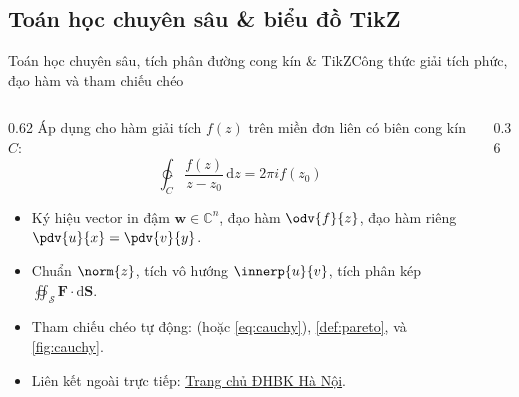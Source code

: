 \documentclass[aspectratio=169,10pt]{beamer}
\begin{document}
\subsection{Toán học chuyên sâu \& biểu đồ TikZ}
\begin{frame}{Toán học chuyên sâu, tích phân đường cong kín \& TikZ}{Công thức giải tích phức, đạo hàm và tham chiếu chéo}
  \begin{columns}[c]
    \begin{column}{0.62\textwidth}
      Áp dụng cho hàm giải tích $f(z)$ trên miền đơn liên có biên cong kín $C$:
      \begin{equation}
        \ointctrclockwise_{C} \frac{f(z)}{z - z_0}\,\mathrm{d}z = 2\pi i f(z_0) \label{eq:cauchy}
      \end{equation}
      \begin{itemize}\setlength{\itemsep}{2pt}
        \item Ký hiệu vector in đậm $\bm{w} \in \mathbb{C}^n$, đạo hàm $\odv{f}{z}$, đạo hàm riêng $\pdv{u}{x} = \pdv{v}{y}$.
        \item Chuẩn $\norm{z}$, tích vô hướng $\innerp{u}{v}$, tích phân kép $\oiint_{\mathcal{S}} \bm{F}\cdot\mathrm{d}\bm{S}$.
        \item Tham chiếu chéo tự động:  (hoặc \eqref{eq:cauchy}), \cref{def:pareto}, và \cref{fig:cauchy}.
        \item Liên kết ngoài trực tiếp: \href{https://hust.edu.vn}{\underline{Trang chủ ĐHBK Hà Nội}}.
      \end{itemize}
    \end{column}
    \begin{column}{0.36\textwidth}
      \centering
      \vskip 2pt
      \label{fig:cauchy}
    \end{column}
  \end{columns}
\end{frame}
\end{document}
